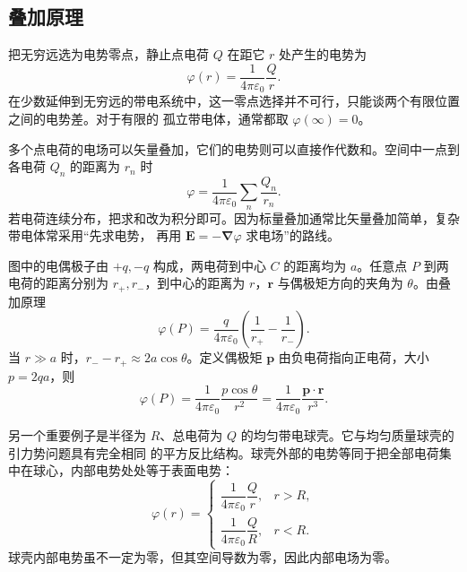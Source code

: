\subsection*{叠加原理}

把无穷远选为电势零点，静止点电荷 $Q$ 在距它 $r$ 处产生的电势为
\begin{equation}
  \boxed{\varphi(r)=\frac{1}{4\pi\varepsilon_0}\frac{Q}{r}}.
\end{equation}
在少数延伸到无穷远的带电系统中，这一零点选择并不可行，只能谈两个有限位置之间的电势差。对于有限的
孤立带电体，通常都取 $\varphi(\infty)=0$。

多个点电荷的电场可以矢量叠加，它们的电势则可以直接作代数和。空间中一点到各电荷 $Q_n$ 的距离为
$r_n$ 时
\begin{equation}
  \boxed{\varphi=\frac{1}{4\pi\varepsilon_0}
  \sum_n\frac{Q_n}{r_n}}.
\end{equation}
若电荷连续分布，把求和改为积分即可。因为标量叠加通常比矢量叠加简单，复杂带电体常采用“先求电势，
再用 $\boldsymbol E=-\boldsymbol\nabla\varphi$ 求电场”的路线。

图中的电偶极子由 $+q,-q$ 构成，两电荷到中心 $C$ 的距离均为 $a$。任意点 $P$ 到两电荷的距离分别为
$r_+,r_-$，到中心的距离为 $r$，$\boldsymbol r$ 与偶极矩方向的夹角为 $\theta$。由叠加原理
\[
  \varphi(P)=\frac{q}{4\pi\varepsilon_0}
  \left(\frac1{r_+}-\frac1{r_-}\right).
\]
当 $r\gg a$ 时，$r_- -r_+\approx2a\cos\theta$。定义偶极矩
$\boldsymbol p$ 由负电荷指向正电荷，大小 $p=2qa$，则
\begin{equation}
  \boxed{\varphi(P)=\frac{1}{4\pi\varepsilon_0}
  \frac{p\cos\theta}{r^2}
  =\frac{1}{4\pi\varepsilon_0}\frac{\boldsymbol p\cdot\boldsymbol r}{r^3}}.
\end{equation}

\dipolePotentialGeometry
{}

另一个重要例子是半径为 $R$、总电荷为 $Q$ 的均匀带电球壳。它与均匀质量球壳的引力势问题具有完全相同
的平方反比结构。球壳外部的电势等同于把全部电荷集中在球心，内部电势处处等于表面电势：
\begin{equation}
  \boxed{\varphi(r)=
  \begin{cases}
    \dfrac{1}{4\pi\varepsilon_0}\dfrac{Q}{r},&r>R,\\[6pt]
    \dfrac{1}{4\pi\varepsilon_0}\dfrac{Q}{R},&r<R.
  \end{cases}}
\end{equation}
球壳内部电势虽不一定为零，但其空间导数为零，因此内部电场为零。


